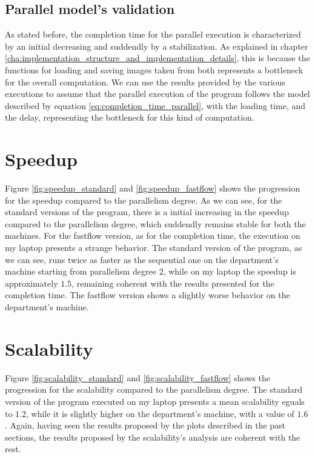         \subsection{Parallel model's validation} %
        \label{sub:parallel_model_s_validation}
            As stated before, the completion time for the parallel execution is characterized by an initial
            decreasing and suddendly by a stabilization. As explained in chapter
            \ref{cha:implementation_structure_and_implementation_details}, this is because the functions for
            loading and saving images taken from \cite{cimg} both represents a bottleneck for
            the overall computation. We can use the results provided by the various executions to assume that
            the parallel execution of the program follows the model described by equation
            \ref{eq:completion_time_parallel}, with the loading time, and the delay, representing the
            bottleneck for this kind of computation.
    \section{Speedup} %
    \label{sec:speedup}
        Figure \ref{fig:speedup_standard} and \ref{fig:speedup_fastflow} shows the progression for the speedup
        compared to the parallelism degree. As we can see, for the standard versions of the program, there is a
        initial increasing in the speedup compared to the parallelism degree, which suddendly remains stable
        for both the machines. For the fastflow version, as for the completion time, the execution on my laptop
        presents a strange behavior. The standard version of the program, as we can see, runs twice as faster
        as the sequential one on the department's machine starting from parallelism degree $2$, while on my
        laptop the speedup is approximately $1.5$, remaining coherent with the results presented for the
        completion time. The fastflow version shows a slightly worse behavior on the department's machine.
    \section{Scalability} %
    \label{sec:scalability}
        Figure \ref{fig:scalability_standard} and \ref{fig:scalability_fastflow} shows the progression for the
        scalability compared to the parallelism degree. The standard version of the program executed on my
        laptop presents a mean scalability eguals to $1.2$, while it is slightly higher on the department's
        machine, with a value of $1.6$. Again, having seen the results proposed by the plots described in the
        past sections, the results proposed by the scalability's analysis are coherent with the rest.
